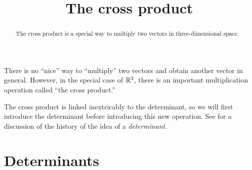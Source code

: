 \documentclass{ximera}
\title[Dig-In:]{The cross product}
\begin{document}
\begin{abstract}
  The cross product is a special way to multiply two vectors in
  three-dimensional space.
\end{abstract}
\maketitle

There is no ``nice'' way to ``multiply'' two vectors and obtain
another vector in general. However, in the special case of $\mathbb R^3$,
there is an important multiplication operation called ``the cross
product.''

The cross product is linked inextricably to the determinant, so we
will first introduce the determinant before introducing this new
operation. See 
for a discussion of the history of the idea of a \textit{determinant}.


\section{Determinants}
\end{document}
